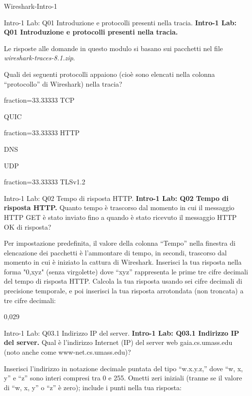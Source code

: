 \documentclass[a4paper]{article}
\begin{document}
\begin{quiz}{Wireshark-Intro-1}

\begin{multi}[points=1,multiple]{Intro-1 Lab: Q01 Introduzione e protocolli presenti nella tracia.}
\textbf{Intro-1 Lab: Q01 Introduzione e protocolli presenti nella tracia.}

Le risposte alle domande in questo modulo si basano sui pacchetti nel file \emph{wireshark-traces-8.1.zip}.

Quali dei seguenti protocolli appaiono (cioè sono elencati nella colonna ``protocollo'' di Wireshark) nella tracia?

\item[fraction=33.33333] TCP
\item QUIC
\item[fraction=33.33333] HTTP
\item DNS
\item UDP
\item[fraction=33.33333] TLSv1.2
\end{multi}

\begin{shortanswer}[points=1]{Intro-1 Lab: Q02 Tempo di risposta HTTP.}
\textbf{Intro-1 Lab: Q02 Tempo di risposta HTTP.}
Quanto tempo è trascorso dal momento in cui il messaggio HTTP GET è stato inviato fino a quando è stato ricevuto il messaggio HTTP OK di risposta?

Per impostazione predefinita, il valore della colonna ``Tempo'' nella finestra di elencazione dei pacchetti è l'ammontare di tempo, in secondi, trascorso dal momento in cui è iniziato la cattura di Wireshark. Inserisci la tua risposta nella forma "0,xyz" (senza virgolette) dove ``xyz'' rappresenta le prime tre cifre decimali del tempo di risposta HTTP. Calcola la tua risposta usando sei cifre decimali di precisione temporale, e poi inserisci la tua risposta arrotondata (non troncata) a tre cifre decimali:

\item 0,029
\end{shortanswer}

\begin{shortanswer}[points=1]{Intro-1 Lab: Q03.1 Indirizzo IP del server.}
\textbf{Intro-1 Lab: Q03.1 Indirizzo IP del server.}
Qual è l'indirizzo Internet (IP) del server web gaia.cs.umass.edu (noto anche come www-net.cs.umass.edu)?

Inserisci l'indirizzo in notazione decimale puntata del tipo ``w.x.y.z,'' dove ``w, x, y'' e ``z'' sono interi compresi tra 0 e 255. Ometti zeri iniziali (tranne se il valore di ``w, x, y'' o ``z'' è zero); include i punti nella tua risposta:


\end{shortanswer}
\end{quiz}
\end{document}
